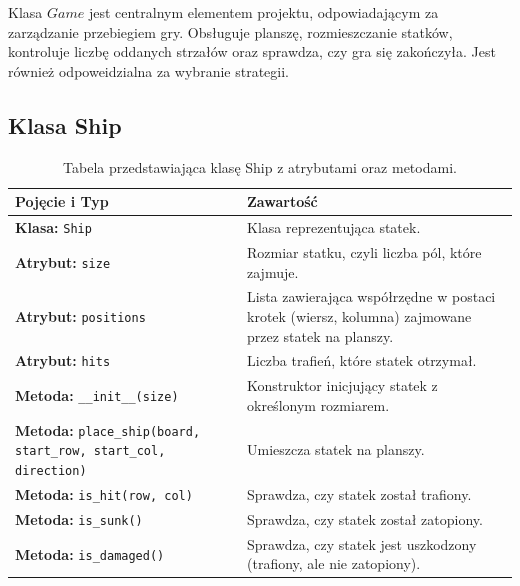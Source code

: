 \documentclass[magisterska]{pracadypl}
\begin{document}
Klasa $Game$ jest centralnym elementem projektu, odpowiadającym za zarządzanie przebiegiem gry. Obsługuje planszę, rozmieszczanie statków, kontroluje liczbę oddanych strzałów oraz sprawdza, czy gra się zakończyła. Jest również odpoweidzialna za wybranie strategii.
\subsection{Klasa Ship}
\begin{table}[H]
\centering
\begin{tabularx}{\textwidth}{|p{6cm}|X|}
\hline
\textbf{Pojęcie i Typ} & \textbf{Zawartość} \\ \hline
\textbf{Klasa:} \texttt{Ship} & Klasa reprezentująca statek. \\ \hline
\textbf{Atrybut:} \texttt{size} & Rozmiar statku, czyli liczba pól, które zajmuje. \\ \hline
\textbf{Atrybut:} \texttt{positions} & Lista zawierająca współrzędne w postaci krotek (wiersz, kolumna) zajmowane przez statek na planszy. \\ \hline
\textbf{Atrybut:} \texttt{hits } & Liczba trafień, które statek otrzymał. \\ \hline
\textbf{Metoda:} \texttt{\_\_init\_\_(size)} & Konstruktor inicjujący statek z określonym rozmiarem. \\ \hline
\textbf{Metoda:} \texttt{place\_ship(board, start\_row, start\_col, direction) } & Umieszcza statek na planszy. \\ \hline
\textbf{Metoda:} \texttt{is\_hit(row, col)} & Sprawdza, czy statek został trafiony. \\ \hline
\textbf{Metoda:} \texttt{is\_sunk()} & Sprawdza, czy statek został zatopiony. \\ \hline
\textbf{Metoda:} \texttt{is\_damaged()} & Sprawdza, czy statek jest uszkodzony (trafiony, ale nie zatopiony). \\ \hline
\end{tabularx}
\caption{Tabela przedstawiająca klasę Ship z atrybutami oraz metodami.}
\end{table}
\end{document}
